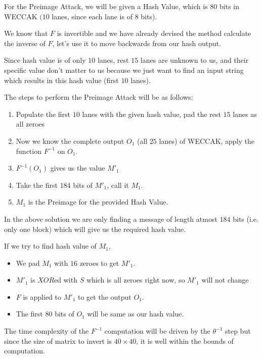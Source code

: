 \documentclass[10pt,twoside]{article}
\begin{document}
\begin{solution}
  For the Preimage Attack, we will be given a Hash Value, which is $80$ bits in WECCAK $(10$ lanes, since each lane is of $8$ bits). \newline

  We know that $F$ is invertible and we have already devised the method calculate the inverse of $F$, let's use it to move backwards from our hash output. \newline

  Since hash value is of only $10$ lanes, rest $15$ lanes are unknown to us, and their specific value don't matter to us because we just want to find an input string which results in this hash value (first $10$ lanes). \newline

  The steps to perform the Preimage Attack will be as follows:
  \begin{enumerate}
    \setlength\itemsep{0em}
    \item Populate the first $10$ lanes with the given hash value, pad the rest $15$ lanes as all zeroes
    \item Now we know the complete output $O_1$ (all $25$ lanes) of WECCAK, apply the function $F^{-1}$ on $O_1$.
    \item $F^{-1}(O_1)$ gives us the value $M'_1$
    \item Take the first $184$ bits of $M'_1$, call it $M_1$.
    \item $M_1$ is the Preimage for the provided Hash Value.
  \end{enumerate}

  In the above solution we are only finding a message of length atmost $184$ bits (i.e. only one block) which will give us the required hash value.

  If we try to find hash value of $M_1$,
  \begin{itemize}
    \setlength\itemsep{0em}
    \item We pad $M_1$ with $16$ zeroes to get $M'_1$.
    \item $M'_1$ is $XOR$ed with $S$ which is all zeroes right now, so $M'_1$ will not change
    \item $F$ is applied to $M'_1$ to get the output $O_1$.
    \item The first $80$ bits of $O_1$ will be same as our hash value.
  \end{itemize}

  The time complexity of the $F^{-1}$ computation will be driven by the $\theta^{-1}$ step but since the size of matrix to invert is $40 \times 40$, it is well within the bounds of computation.
\end{solution}
\end{document}
